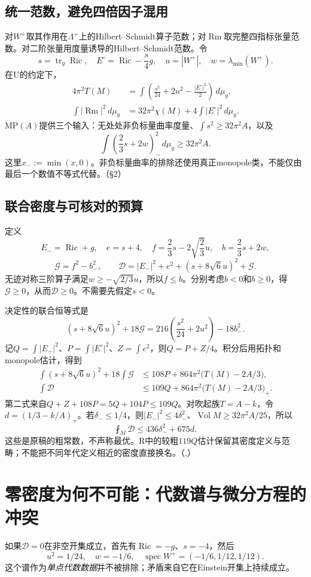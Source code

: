 \documentclass[UTF8,fontset=fandol,zihao=-4]{ctexart}
\theoremstyle{research}
\DeclareMathOperator{\Ric}{Ric}
\DeclareMathOperator{\Rm}{Rm}
\DeclareMathOperator{\Vol}{Vol}
\DeclareMathOperator{\tr}{tr}
\DeclareMathOperator{\spec}{spec}
\newcommand{\dd}{\,d\mu_g}
\newcommand{\Dcal}{\mathcal D}
\numberwithin{equation}{section}
\begin{document}
\subsection{统一范数，避免四倍因子混用}
对$W^+$取其作用在$\Lambda^+$上的Hilbert--Schmidt算子范数；对$\Rm$取完整四指标张量范数。对二阶张量用度量诱导的Hilbert--Schmidt范数。令
\[
s=\tr_g\Ric,\quad E^\circ=\Ric-\frac{s}{4}g,\quad u=|W^+|,\quad w=\lambda_{\min}(W^+).
\]
在U的约定下，
\begin{align}
4\pi^2T(M)&=\int\left(\frac{s^2}{24}+2u^2-\frac{|E^\circ|^2}{2}\right)\dd,\\
\int|\Rm|^2\dd&=32\pi^2\chi(M)+4\int|E^\circ|^2\dd.
\end{align}
$\mathrm{MP}(A)$提供三个输入：无处处非负标量曲率度量、$\int s^2\ge32\pi^2A$，以及
\[
\int\left(\frac23s+2w\right)_{-}^{2}\dd\ge32\pi^2A.
\]
这里$x_-:=\min(x,0)$。非负标量曲率的排除还使用真正monopole类，不能仅由最后一个数值不等式代替。\cite{U}（§2）

\subsection{联合密度与可核对的预算}
定义
\[
E_-=\Ric+g,\quad e=s+4,\quad f=\frac23s-2\sqrt{\frac23}u,\quad b=\frac23s+2w,
\]
\[
\mathcal G=f^2-b_-^2,\qquad
\Dcal=|E_-|^2+e^2+(s+8\sqrt6u)^2+\mathcal G.
\]
无迹对称三阶算子满足$w\ge-\sqrt{2/3}u$，所以$f\le b$。分别考虑$b<0$和$b\ge0$，得$\mathcal G\ge0$，从而$\Dcal\ge0$。不需要先假定$s<0$。

决定性的联合恒等式是
\[
(s+8\sqrt6u)^2+18\mathcal G
=216\left(\frac{s^2}{24}+2u^2\right)-18b_-^2.
\]
记$Q=\int|E_-|^2$、$P=\int|E^\circ|^2$、$Z=\int e^2$，则$Q=P+Z/4$。积分后用拓扑和monopole估计，得到
\begin{align}
\int(s+8\sqrt6u)^2+18\int\mathcal G
&\le108P+864\pi^2\bigl(T(M)-2A/3\bigr),\\
\int\Dcal&\le109Q+864\pi^2\bigl(T(M)-2A/3\bigr)_+.
\end{align}
第二式来自$Q+Z+108P=5Q+104P\le109Q$。对吹起族$T=A-k$，令$d=(1/3-k/A)_+$。若$\delta_-\le1/4$，则$|E_-|^2\le4\delta_-^2$、$\Vol M\ge32\pi^2A/25$，所以
\begin{equation}\label{eq:budget}
\boxed{\fint_M\Dcal\le436\delta_-^2+675d.}
\end{equation}
这些是原稿的粗常数，不声称最优。R中的较粗$119Q$估计保留其密度定义与范畴；不能把不同年代定义相近的密度直接换名。\cite{U}（,）

\section{零密度为何不可能：代数谱与微分方程的冲突}
如果$\Dcal=0$在非空开集成立，首先有$\Ric=-g$、$s=-4$，然后
\[
u^2=1/24,\quad w=-1/6,\quad
\spec W^+=(-1/6,1/12,1/12).
\]
这个谱作为\emph{单点代数数据}并不被排除；矛盾来自它在Einstein开集上持续成立。
\end{document}
